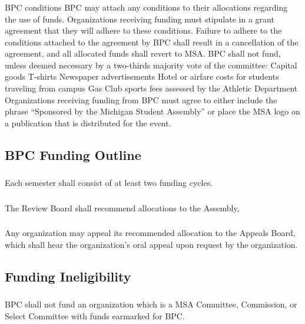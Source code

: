 \subsubsection{}
BPC conditions
\subsubsubsection{}
BPC may attach any conditions to their allocations regarding the use of funds.
\subsubsubsection{}
Organizations receiving funding must stipulate in a grant agreement that they will adhere to these conditions.
\subsubsubsection{}
Failure to adhere to the conditions attached to the agreement by BPC shall result in a cancellation of the agreement, and all allocated funds shall revert to MSA.
\subsubsubsection{}
BPC shall not fund, unless deemed necessary by a two-thirds majority vote of the committee:
\subsubsubsubsection{}
Capital goods
\subsubsubsubsection{}
T-shirts
\subsubsubsubsection{}
Newspaper advertisements
\subsubsubsubsection{}
Hotel or airfare costs for students traveling from campus
\subsubsubsubsection{}
Gas
\subsubsubsubsection{}
Club sports fees assessed by the Athletic Department
\subsubsubsection{}
Organizations receiving funding from BPC must agree to either include the phrase ``Sponsored by the Michigan Student Assembly'' or place the MSA logo on a publication that is distributed for the event.
 
\subsection{BPC Funding Outline}
\subsubsection{}
Each semester shall consist of at least two funding cycles.
\subsubsection{}
The Review Board shall recommend allocations to the Assembly,
\subsubsection{}
Any organization may appeal its recommended allocation to the Appeals Board, which shall hear the organization's oral appeal upon request by the organization.

\subsection{Funding Ineligibility}
\subsubsection{}
BPC shall not fund an organization which is a MSA Committee, Commission, or Select Committee with funds earmarked for BPC. 
